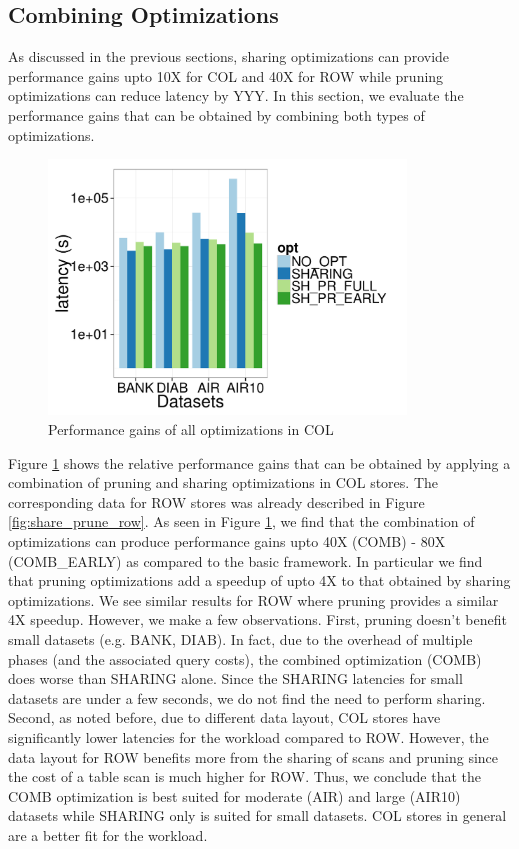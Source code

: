 \subsection{Combining Optimizations}
\label{sec:sharing_and_pruning}
As discussed in the previous sections, sharing optimizations can provide performance gains upto 10X for COL and 40X for ROW while pruning optimizations can reduce latency by YYY.
In this section, we evaluate the performance gains that can be obtained by combining both types of optimizations.

\begin{figure}[h]
	\centering
	\includegraphics[width=9.5cm] {Images/all_opt_real_data_col.pdf}
	\caption{Performance gains of all optimizations in COL}
	\label{fig:share_prune_col}
	\vspace{-15pt}
\end{figure}

Figure \ref{fig:share_prune_col} shows the relative performance gains that can be obtained by applying a combination of pruning and sharing optimizations in COL stores. 
The corresponding data for ROW stores was already described in Figure \ref{fig:share_prune_row}. 
As seen in Figure \ref{fig:share_prune_col}, we find that the combination of optimizations can produce performance gains upto 40X (COMB) - 80X (COMB\_EARLY) as compared to the basic \SeeDB framework.
In particular we find that pruning optimizations add a speedup of upto 4X to that obtained by sharing optimizations.
We see similar results for ROW where pruning provides a similar 4X speedup.
However, we make a few observations. First, pruning doesn't benefit small datasets (e.g. BANK, DIAB). In fact, due to the overhead of multiple phases (and the associated query costs), the combined optimization (COMB) does worse than SHARING alone. Since the SHARING latencies for small datasets are under a few seconds, we do not find the need to perform sharing.
Second, as noted before, due to different data layout, COL stores have significantly lower latencies for the \SeeDB workload compared to ROW.
However, the data layout for ROW benefits more from the sharing of scans and pruning since the cost of a table scan is much higher for ROW.
Thus, we conclude that the COMB optimization is best suited for moderate (AIR) and large (AIR10) datasets while SHARING only is suited for small datasets.
COL stores in general are a better fit for the \SeeDB workload.

